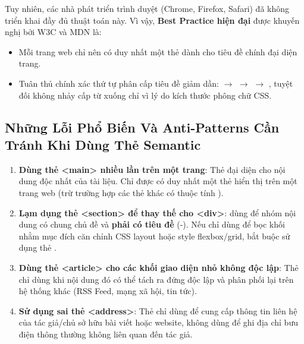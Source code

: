 Tuy nhiên, các nhà phát triển trình duyệt (Chrome, Firefox, Safari) đã không triển khai đầy đủ thuật toán này. Vì vậy, \textbf{Best Practice hiện đại} được khuyến nghị bởi W3C và MDN là:
\begin{itemize}[leftmargin=1.8em, itemsep=3pt, parsep=0pt]
    \item Mỗi trang web chỉ nên có duy nhất một thẻ  dành cho tiêu đề chính đại diện trang.
    \item Tuân thủ chính xác thứ tự phân cấp tiêu đề giảm dần:  $\rightarrow$  $\rightarrow$  $\rightarrow$ , tuyệt đối không nhảy cấp từ  xuống  chỉ vì lý do kích thước phông chữ CSS.
\end{itemize}

\subsection{Những Lỗi Phổ Biến Và Anti-Patterns Cần Tránh Khi Dùng Thẻ Semantic}

\begin{warnBox}
\begin{enumerate}[leftmargin=1.5em, itemsep=4pt, parsep=0pt]
    \item \textbf{Dùng thẻ <main> nhiều lần trên một trang}: Thẻ  đại diện cho nội dung độc nhất của tài liệu. Chỉ được có duy nhất một thẻ  hiển thị trên một trang web (trừ trường hợp các thẻ  khác có thuộc tính ).
    \item \textbf{Lạm dụng thẻ <section> để thay thế cho <div>}:  dùng để nhóm nội dung có chung chủ đề và \textbf{phải có tiêu đề} (-). Nếu chỉ dùng để bọc khối nhằm mục đích căn chỉnh CSS layout hoặc style flexbox/grid, bắt buộc sử dụng thẻ .
    \item \textbf{Dùng thẻ <article> cho các khối giao diện nhỏ không độc lập}: Thẻ  chỉ dùng khi nội dung đó có thể tách ra đứng độc lập và phân phối lại trên hệ thống khác (RSS Feed, mạng xã hội, tin tức).
    \item \textbf{Sử dụng sai thẻ <address>}: Thẻ  chỉ dùng để cung cấp thông tin liên hệ của tác giả/chủ sở hữu bài viết hoặc website, không dùng để ghi địa chỉ bưu điện thông thường không liên quan đến tác giả.
\end{enumerate}
\end{warnBox}

